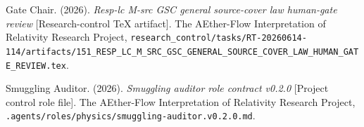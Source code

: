 \documentclass[11pt]{article}
\begin{document}
Gate Chair. (2026). \textit{Resp-lc M-src GSC general source-cover law
human-gate review} [Research-control TeX artifact]. The AEther-Flow
Interpretation of Relativity Research Project,
\texttt{research\_control/tasks/RT-20260614-114/artifacts/151\_RESP\_LC\_M\_SRC\_GSC\_GENERAL\_SOURCE\_COVER\_LAW\_HUMAN\_GATE\_REVIEW.tex}.

Smuggling Auditor. (2026). \textit{Smuggling auditor role contract v0.2.0}
[Project control role file]. The AEther-Flow Interpretation of Relativity
Research Project,
\texttt{.agents/roles/physics/smuggling-auditor.v0.2.0.md}.
\end{document}
